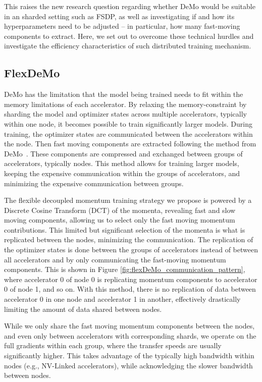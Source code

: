 This raises the new research question regarding whether DeMo would be suitable in an sharded setting such as FSDP, as well as investigating if and how its hyperparameters need to be adjusted -- in particular, how many fast-moving components to extract. Here, we set out to overcome these technical hurdles and investigate the efficiency characteristics of such distributed training mechanism.

\subsection{FlexDeMo}
DeMo has the limitation that the model being trained needs to fit within the memory limitations of each accelerator. By relaxing the memory-constraint by sharding the model and optimizer states across multiple accelerators, typically within one node, it becomes possible to train significantly larger models. 
During training, the optimizer states are communicated between the accelerators within the node. Then fast moving components are extracted following the method from DeMo~\cite{peng2024demodecoupledmomentumoptimization}. These components are compressed and exchanged between groups of accelerators, typically nodes. This method allows for training larger models, keeping the expensive communication within the groups of accelerators, and minimizing the expensive communication between groups.

The flexible decoupled momentum training strategy we propose is powered by a Discrete Cosine Transform (DCT) of the momenta, revealing fast and slow moving components, allowing us to select only the fast moving momentum contributions. This limited but significant selection of the momenta is what is replicated between the nodes, minimizing the communication. The replication of the optimizer states is done between the groups of accelerators instead of between all accelerators and by only communicating the fast-moving momentum components. This is shown in Figure \ref{fig:flexDeMo_communication_pattern}, where accelerator 0 of node 0 is replicating momentum components to accelerator 0 of node 1, and so on. With this method, there is no replication of data between accelerator 0 in one node and accelerator 1 in another, effectively drastically limiting the amount of data shared between nodes.

While we only share the fast moving momentum components between the nodes, and even only between accelerators with corresponding shards, we operate on the full gradients within each group, where the transfer speeds are usually significantly higher. This takes advantage of the typically high bandwidth within nodes (e.g.,  NV-Linked accelerators), while acknowledging the slower bandwidth between nodes.

